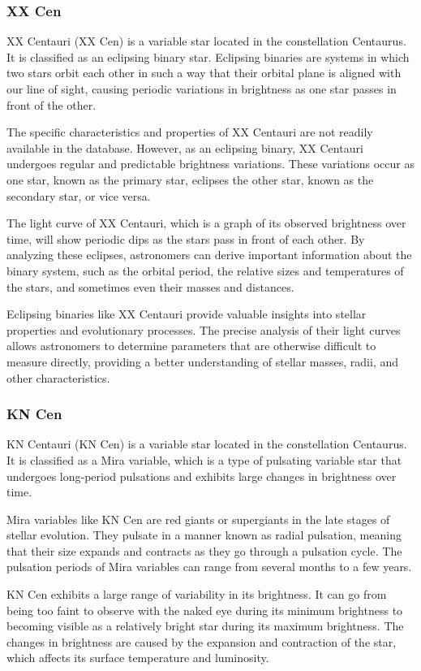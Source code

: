 \subsubsection*{ XX Cen }
XX Centauri (XX Cen) is a variable star located in the constellation Centaurus. It is classified as an eclipsing binary star. Eclipsing binaries are systems in which two stars orbit each other in such a way that their orbital plane is aligned with our line of sight, causing periodic variations in brightness as one star passes in front of the other.

The specific characteristics and properties of XX Centauri are not readily available in the database. However, as an eclipsing binary, XX Centauri undergoes regular and predictable brightness variations. These variations occur as one star, known as the primary star, eclipses the other star, known as the secondary star, or vice versa.

The light curve of XX Centauri, which is a graph of its observed brightness over time, will show periodic dips as the stars pass in front of each other. By analyzing these eclipses, astronomers can derive important information about the binary system, such as the orbital period, the relative sizes and temperatures of the stars, and sometimes even their masses and distances.

Eclipsing binaries like XX Centauri provide valuable insights into stellar properties and evolutionary processes. The precise analysis of their light curves allows astronomers to determine parameters that are otherwise difficult to measure directly, providing a better understanding of stellar masses, radii, and other characteristics.

\subsubsection*{ KN Cen }
KN Centauri (KN Cen) is a variable star located in the constellation Centaurus. It is classified as a Mira variable, which is a type of pulsating variable star that undergoes long-period pulsations and exhibits large changes in brightness over time.

Mira variables like KN Cen are red giants or supergiants in the late stages of stellar evolution. They pulsate in a manner known as radial pulsation, meaning that their size expands and contracts as they go through a pulsation cycle. The pulsation periods of Mira variables can range from several months to a few years.

KN Cen exhibits a large range of variability in its brightness. It can go from being too faint to observe with the naked eye during its minimum brightness to becoming visible as a relatively bright star during its maximum brightness. The changes in brightness are caused by the expansion and contraction of the star, which affects its surface temperature and luminosity.

